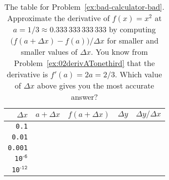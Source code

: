 \begin{table}[h]
  \centering
  \begin{tabular}{r|p{75pt}|p{75pt}|p{75pt}|p{75pt}}
    \hline\rule[-6pt]{0pt}{18pt}
    $\Delta x$ & $a+\Delta x$ & $f(a+\Delta x)$ & $\Delta y$ & $\Delta y / \Delta x$ \\
    \hline\rule[-6pt]{0pt}{18pt}
    \texttt{0.1} &&&&\\
    \hline\rule[-6pt]{0pt}{18pt}
    \texttt{0.01} &&&&\\
    \hline\rule[-6pt]{0pt}{18pt}
    \texttt{0.001} &&&&\\
    \hline\rule[-6pt]{0pt}{18pt}
    \texttt{10}$^{\texttt{-6}}$ &&&&\\
    \hline\rule[-6pt]{0pt}{18pt}
    \texttt{10}$^{\texttt{-12}}$ &&&&\\
    \hline
  \end{tabular}
  \medskip
  
  \caption{The table for Problem~\ref{ex:bad-calculator-bad}.
  Approximate the derivative of $f(x) = x^2$ at
  $a=1/3 \approx 0.333\,333\,333\,333$ by computing $\bigl(f(a+\Delta
  x) - f(a)\bigr)/\Delta x$ for smaller and smaller values of $\Delta
  x$.  You know from Problem~\ref{ex:02derivATonethird} that
  the derivative is $f'(a) = 2a = 2/3$.  Which value of
  $\Delta x$ above gives you the most accurate answer?}
\end{table}








